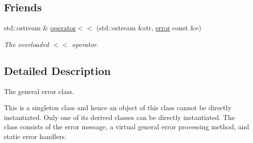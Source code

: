 \subsection*{\-Friends}
\begin{DoxyCompactItemize}
\item 
\hypertarget{classutil_1_1common_1_1error_a9986db03a548ff6e2aee1541fef8b962}{std\-::ostream \& \hyperlink{classutil_1_1common_1_1error_a9986db03a548ff6e2aee1541fef8b962}{operator$<$$<$} (std\-::ostream \&str, \hyperlink{classutil_1_1common_1_1error}{error} const \&e)}\label{classutil_1_1common_1_1error_a9986db03a548ff6e2aee1541fef8b962}

\begin{DoxyCompactList}\small\item\em \-The overloaded $<$$<$ operator. \end{DoxyCompactList}\end{DoxyCompactItemize}


\subsection{\-Detailed \-Description}
\-The general error class. 

\-This is a singleton class and hence an object of this class cannot be directly instantiated. \-Only one of its derived classes can be directly instantiated. \-The class consists of the error message, a virtual general error processing method, and static error handlers. 

